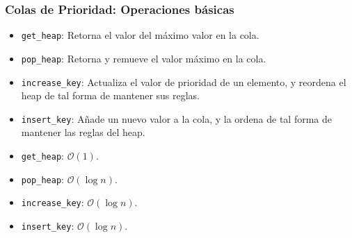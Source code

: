 \documentclass{beamer}
\begin{document}
\begin{frame}[fragile]
 \frametitle{Colas de Prioridad: Operaciones básicas}
\small 

\begin{itemize}
\item \texttt{get\_heap}: Retorna el valor del máximo valor en la cola.
\item \texttt{pop\_heap}: Retorna y remueve el valor máximo en la cola. 
\item \texttt{increase\_key}: Actualiza el valor de prioridad de un elemento, y reordena el heap de tal forma de mantener sus reglas. 
\item \texttt{insert\_key}: Añade un nuevo valor a la cola, y la ordena de tal forma de mantener las reglas del heap.
\end{itemize}


\begin{itemize}
\item \texttt{get\_heap}: $\mathcal{O}(1)$.
\item \texttt{pop\_heap}: $\mathcal{O}(\log n)$.
\item \texttt{increase\_key}: $\mathcal{O}(\log n)$.
\item \texttt{insert\_key}: $\mathcal{O}(\log n)$. 
\end{itemize}

\end{frame}
\end{document}
